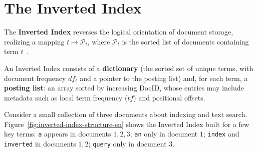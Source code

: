 \FloatBarrier
\section{The Inverted Index}

The \textbf{Inverted Index} reverses the logical orientation of document storage, realizing a mapping $t \mapsto \mathcal{P}_t$, where $\mathcal{P}_t$ is the sorted list of documents containing term $t$~\cite{manning2008}.

\begin{definition}
An Inverted Index consists of a \textbf{dictionary} (the sorted set of unique terms, with document frequency $df_t$ and a pointer to the posting list) and, for each term, a \textbf{posting list}: an array sorted by increasing DocID, whose entries may include metadata such as local term frequency ($tf$) and positional offsets.
\end{definition}

\begin{example}
Consider a small collection of three documents about indexing and text search. Figure~\ref{fig:inverted-index-structure-en} shows the Inverted Index built for a few key terms: \texttt{a} appears in documents $1,2,3$; \texttt{an} only in document $1$; \texttt{index} and \texttt{inverted} in documents $1,2$; \texttt{query} only in document $3$.
\end{example}

